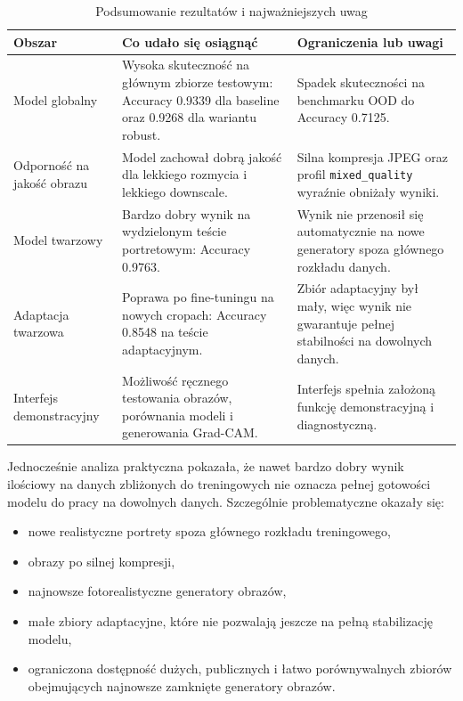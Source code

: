 \begin{table}[H]
\centering
\caption{Podsumowanie rezultatów i najważniejszych uwag}
\label{tab:cele-projektu}
\begin{tabular}{|L{4.2cm}|L{5.0cm}|L{4.2cm}|}
\hline
\textbf{Obszar} & \textbf{Co udało się osiągnąć} & \textbf{Ograniczenia lub uwagi} \\
\hline
Model globalny & Wysoka skuteczność na głównym zbiorze testowym: Accuracy 0.9339 dla baseline oraz 0.9268 dla wariantu robust. & Spadek skuteczności na benchmarku OOD do Accuracy 0.7125. \\
\hline
Odporność na jakość obrazu & Model zachował dobrą jakość dla lekkiego rozmycia i lekkiego downscale. & Silna kompresja JPEG oraz profil \texttt{mixed\_quality} wyraźnie obniżały wyniki. \\
\hline
Model twarzowy & Bardzo dobry wynik na wydzielonym teście portretowym: Accuracy 0.9763. & Wynik nie przenosił się automatycznie na nowe generatory spoza głównego rozkładu danych. \\
\hline
Adaptacja twarzowa & Poprawa po fine-tuningu na nowych cropach: Accuracy 0.8548 na teście adaptacyjnym. & Zbiór adaptacyjny był mały, więc wynik nie gwarantuje pełnej stabilności na dowolnych danych. \\
\hline
Interfejs demonstracyjny & Możliwość ręcznego testowania obrazów, porównania modeli i generowania Grad-CAM. & Interfejs spełnia założoną funkcję demonstracyjną i diagnostyczną. \\
\hline
\end{tabular}
\end{table}

Jednocześnie analiza praktyczna pokazała, że nawet bardzo dobry wynik ilościowy na danych zbliżonych do treningowych nie oznacza pełnej gotowości modelu do pracy na dowolnych danych. Szczególnie problematyczne okazały się:

\begin{itemize}
    \item nowe realistyczne portrety spoza głównego rozkładu treningowego,
    \item obrazy po silnej kompresji,
    \item najnowsze fotorealistyczne generatory obrazów,
    \item małe zbiory adaptacyjne, które nie pozwalają jeszcze na pełną stabilizację modelu,
    \item ograniczona dostępność dużych, publicznych i łatwo porównywalnych zbiorów obejmujących najnowsze zamknięte generatory obrazów.
\end{itemize}

